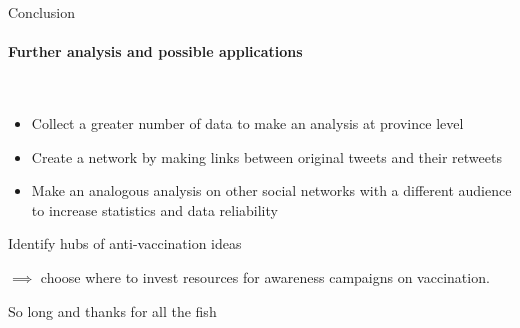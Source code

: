 \documentclass[9pt]{beamer}
\begin{document}
	
\begin{frame}{Conclusion}
	    \framesubtitle{Further analysis and possible applications}
	
	 \\
	\medskip
	\begin{itemize}
	    \item Collect a greater number of data to make an \alert{analysis at province level}
	    
	    \item Create a \alert{network} by making links between original tweets and their retweets
	    
	    \item Make an analogous analysis on \alert{other social networks} with a different audience to increase statistics and data reliability
	    
	\end{itemize}
	\pause
	 \vspace{1cm}
	 
	\medskip
	
	Identify hubs of anti-vaccination ideas 
	
	\medskip

	$\implies$ choose where to invest resources for awareness campaigns on vaccination.


	\end{frame}
\begin{frame}
 \vspace{0.32cm}
	\centering
\huge{So long and thanks for all the fish}    
	

\end{frame}
	
\end{document}
